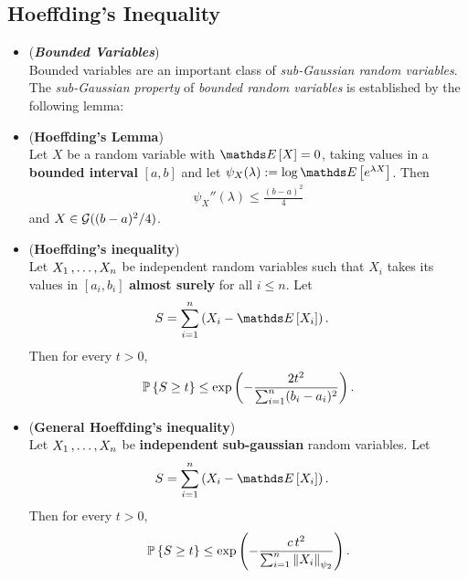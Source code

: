 \documentclass[11pt]{article}
\begin{document}
\subsection{Hoeffding's Inequality}
\begin{itemize}
\item \begin{remark} (\textbf{\emph{Bounded Variables}})\\
Bounded variables are an important class of \emph{sub-Gaussian random variables}. The \emph{sub-Gaussian property} of \emph{bounded random variables} is established by the
following lemma:
\end{remark}

\item \begin{lemma} (\textbf{Hoeffding's Lemma}) \citep{boucheron2013concentration} \\
Let $X$ be a random variable with $\E{}{X} = 0$, taking values in a \textbf{bounded interval} $[a, b]$ and let $\psi_{X}(\lambda) := \log  \E{}{e^{\lambda X}}$. Then
\begin{align*}
\psi_{X}''(\lambda) \le \frac{(b - a)^2}{4}
\end{align*}
and $X \in {\mathcal G}((b - a)^2/4)$.
\end{lemma}

\item \begin{proposition} (\textbf{Hoeffding's inequality}) \citep{boucheron2013concentration} \\
Let $X_1 \,{,}\ldots{,}\, X_n$ be independent random variables such that $X_i$ takes its values in $[a_i, b_i]$ \textbf{almost surely} for all $i \le n$. Let
\begin{align*}
S &= \sum_{i=1}^{n}\paren{X_i - \E{}{X_i}}.
\end{align*}
Then for every $t > 0$,
\begin{align}
{\mathbb P}\left\{S \ge  t\right\} \le \exp\left(- \frac{2t^2}{\sum_{i=1}^{n}(b_i - a_i)^2}\right). \label{ineqn: hoeffding_inequality}
\end{align}
\end{proposition}

\item 
 \begin{proposition} (\textbf{General Hoeffding's inequality}) \citep{vershynin2018high} \\
Let $X_1 \,{,}\ldots{,}\, X_n$ be \textbf{independent} \textbf{sub-gaussian} random variables. Let
\begin{align*}
S &= \sum_{i=1}^{n}\paren{X_i - \E{}{X_i}}.
\end{align*}
Then for every $t > 0$,
\begin{align}
{\mathbb P}\left\{S \ge  t\right\}  \le \exp\left(- \frac{c\,t^2}{\sum_{i=1}^{n}\left\|X_i\right\|_{\psi_2}}\right). \label{ineqn: general_hoeffding_inequality}
\end{align}
\end{proposition}
\end{itemize}
\end{document}
